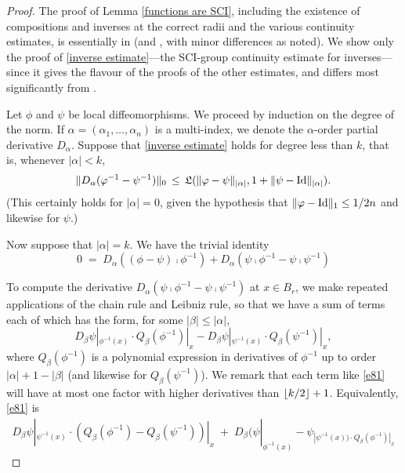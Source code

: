 \documentclass{article}
\begin{document}
\begin{proof}
The proof of Lemma \ref{functions are SCI}, including the existence of compositions and inverses at the correct radii and the various continuity estimates, is essentially in \cite{Conn} (and \cite{MonnierZung}, with minor differences as noted).  We show only the proof of \eqref{inverse estimate}---the SCI-group continuity estimate for inverses---since it gives the flavour of the proofs of the other estimates, and differs most significantly from \cite{MirandaMonnierZung}.

Let $\phi$ and $\psi$ be local diffeomorphisms.  We proceed by induction on the degree of the norm.  If $\alpha=(\alpha_1,\ldots,\alpha_n)$ is a multi-index, we denote the $\alpha$-order partial derivative $D_\alpha$.  Suppose that \eqref{inverse estimate} holds for degree less than $k$, that is, whenever $|\alpha| < k$,
$$\|D_\alpha(\varphi^{-1}-\psi^{-1})\|_0 \,\leq\, \mathfrak{L}(\|\varphi-\psi\|_{|\alpha|},1+\|\psi-\textrm{Id}\|_{|\alpha|}).$$
(This certainly holds for $|\alpha|=0$, given the hypothesis that $\|\varphi-\textrm{Id}\|_1 \leq 1/2n$ and likewise for $\psi$.)

Now suppose that $|\alpha| = k$.  We have the trivial identity
\begin{equation}\label{e80}
0 \;=\; D_\alpha\left((\phi-\psi)\comp\phi^{-1}\right) + D_\alpha\left(\psi\comp\phi^{-1} - \psi\comp\psi^{-1}\right)
\end{equation}

To compute the derivative $D_\alpha(\psi\comp\phi^{-1} - \psi\comp\psi^{-1})$ at $x\in B_r$, we make repeated applications of the chain rule and Leibniz rule, so that we have a sum of terms each of which has the form, for some $|\beta|\leq|\alpha|$,
\begin{equation}\label{e81}
D_\beta\psi|_{\phi^{-1}(x)}\cdot Q_\beta\left(\phi^{-1}\right)|_x - D_\beta\psi|_{\psi^{-1}(x)}\cdot Q_\beta\left(\psi^{-1}\right)|_x,
\end{equation}
where $Q_\beta(\phi^{-1})$ is a polynomial expression in derivatives of $\phi^{-1}$ up to order $\left.|\alpha|+1-|\beta|\right.$ (and likewise for $Q_\beta(\psi^{-1})$).  We remark that each term like \eqref{e81} will have at most one factor with higher derivatives than $\left\lfloor k/2 \right\rfloor+1$. Equivalently, \eqref{e81} is
\begin{eqnarray*}
D_\beta\psi|_{\psi^{-1}(x)}\cdot \left.\left(Q_\beta(\phi^{-1}) - Q_\beta(\psi^{-1})\right)\right|_x
\;+\; D_\beta(\psi|_{\phi^{-1}(x)} - \psi_|{\psi^{-1}(x)})\cdot Q_\beta\left(\phi^{-1}\right)|_x
\end{eqnarray*}


\end{proof}
\end{document}
